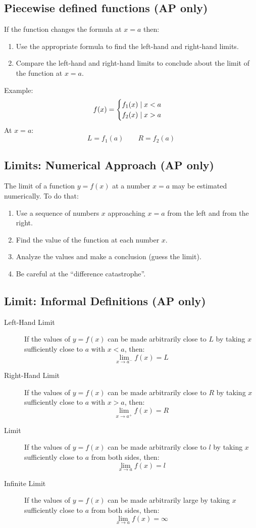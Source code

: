 \subsection{Piecewise defined functions (AP only)}
	If the function changes the formula at $x=a$ then:
	\begin{enumerate}
		\item Use the appropriate formula to find the left-hand and right-hand limits.
		\item Compare the left-hand and right-hand limits to conclude about the limit of the function at $x=a$.
	\end{enumerate}
	Example:
	\begin{equation*}
		f(x) =
		\begin{cases}
			f_1(x) \mid x < a\\
			f_2(x) \mid x > a
		\end{cases}
	\end{equation*}
	At $x=a$:
	\[L = f_1(a) \qquad R = f_2(a)\]
\subsection{Limits: Numerical Approach (AP only)}
	The limit of a function $y=f(x)$ at a number $x=a$ may be estimated numerically.
	To do that:
	\begin{enumerate}
		\item Use a sequence of numbers $x$ approaching $x=a$ from the left and from the right.
		\item Find the value of the function at each number $x$.
		\item Analyze the values and make a conclusion (guess the limit).
		\item Be careful at the ``difference catastrophe''.
	\end{enumerate}
\subsection{Limit: Informal Definitions (AP only)}
	\begin{description}
		\item[Left-Hand Limit] If the values of $y=f(x)$ can be made arbitrarily close to $L$ by taking $x$ sufficiently close to $a$ with $x<a$, then: \[\lim_{x \to a^-} f(x) = L\]
		\item[Right-Hand Limit] If the values of $y=f(x)$ can be made arbitrarily close to $R$ by taking $x$ sufficiently close to $a$ with $x>a$, then: \[\lim_{x \to a^+} f(x) = R\]
		\item[Limit] If the values of $y=f(x)$ can be made arbitrarily close to $l$ by taking $x$ sufficiently close to $a$ from both sides, then: \[\lim_{x \to a} f(x) = l\]
		\item[Infinite Limit] If the values of $y=f(x)$ can be made arbitrarily large by taking $x$ sufficiently close to $a$ from both sides, then: \[\lim_{x \to a} f(x) = \infty\]
	\end{description}
